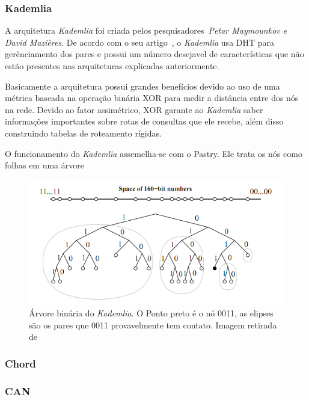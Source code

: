 \subsubsection{Kademlia}

A arquitetura \emph{Kademlia} foi criada pelos pesquisadores~\emph{Petar Maymounkov e David Mazières}. De acordo com o seu artigo~\cite{maymounkov02}, o \emph{Kademlia} usa DHT para gerênciamento dos pares e possui um número desejavel de características que não estão presentes nas arquiteturas explicadas anteriormente.

Basicamente a arquitetura possui grandes benefícios devido ao uso de uma métrica baseada na operação binária XOR para medir a distância entre dos nós na rede. Devido ao fator assimétrico, XOR garante ao \emph{Kademlia} saber informações importantes sobre rotas de consultas que ele recebe, além disso construindo tabelas de roteamento rígidas.

O funcionamento do \emph{Kademlia} assemelha-se com o Pastry. Ele trata os nós como folhas em uma árvore

\begin{figure}
	\centering
	\includegraphics[scale=0.5]{images/arvore-kademlia.png}
	\caption{Árvore binária do \emph{Kademlia}. O Ponto preto é o nó 0011, as elipses são os pares que 0011 provavelmente tem contato. Imagem retirada de~\cite{welzi11}}
	\label{fig:arvore-kademlia}
\end{figure}

\subsubsection{Chord}

\subsubsection{CAN}

